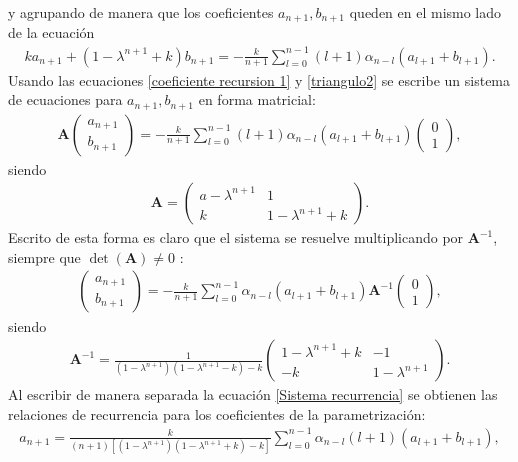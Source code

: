 y agrupando de manera que los coeficientes $a_{n+1},b_{n+1}$ queden en el mismo lado de la ecuación
\begin{eqnarray}
k a_{n+1}+(1-\lambda^{n+1}+k)b_{n+1}=-\frac{k}{n+1}\sum_{l=0}^{n-1}(l+1)\alpha_{n-l}
(a_{l+1}+b_{l+1}).
\label{triangulo2}
\end{eqnarray}
Usando las ecuaciones \eqref{coeficiente recursion 1} y \eqref{triangulo2} se escribe un sistema de ecuaciones para $a_{n+1},b_{n+1}$ en forma matricial:
\begin{eqnarray}
\mathbf{A}\begin{pmatrix}
a_{n+1}\\
b_{n+1}
\end{pmatrix}=-\frac{k}{n+1}\sum_{l=0}^{n-1}(l+1)\alpha_{n-l}(a_{l+1}+b_{l+1})\begin{pmatrix}
0\\
1
\end{pmatrix},
\label{sistema recurrencia}
\end{eqnarray}
siendo 
\begin{eqnarray}
\mathbf{A}=\begin{pmatrix}
a-\lambda^{n+1} & 1 \\
k & 1-\lambda^{n+1}+k
\end{pmatrix}.
\end{eqnarray}
Escrito de esta forma es claro que el sistema se resuelve multiplicando por $\mathbf{A}^{-1}$, siempre que $\det(\mathbf{A})\neq 0$ :
\begin{eqnarray}
\begin{pmatrix}
a_{n+1}\\
b_{n+1}
\end{pmatrix}=-\frac{k}{n+1}\sum_{l=0}^{n-1}\alpha_{n-l}(a_{l+1}+b_{l+1})\mathbf{A}^{-1}\begin{pmatrix}
0\\
1
\end{pmatrix},
\label{Sistema recurrencia}
\end{eqnarray}
siendo
\begin{eqnarray}
\mathbf{A}^{-1}=\frac{1}{(1-\lambda^{n+1})(1-\lambda^{n+1}-k)-k}\begin{pmatrix}
1-\lambda^{n+1}+k & -1\\
-k & 1-\lambda^{n+1}
\end{pmatrix}.
\end{eqnarray}
Al escribir de manera separada la ecuación \eqref{Sistema recurrencia} se obtienen las relaciones de recurrencia para los coeficientes de la parametrización:
\begin{eqnarray}
a_{n+1}=\frac{k}{(n+1)[(1-\lambda^{n+1})(1-\lambda^{n+1}+k)-k]}\sum_{l=0}^{n-1}\alpha_{n-l}(l+1)(a_{l+1}+b_{l+1}),
\end{eqnarray}

